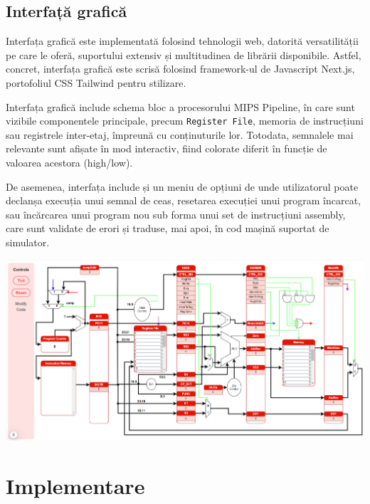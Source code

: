 \documentclass{article}
\begin{document}
\subsection{Interfață grafică}
Interfața grafică este implementată folosind tehnologii web, datorită versatilității pe care le oferă, suportului extensiv și multitudinea de librării disponibile. Astfel, concret, interfața grafică este scrisă folosind framework-ul de Javascript Next.js, portofoliul CSS Tailwind pentru stilizare.

Interfața grafică include schema bloc a procesorului MIPS Pipeline, în care sunt vizibile componentele principale, precum \texttt{Register File}, memoria de instrucțiuni sau registrele inter-etaj, împreună cu conținuturile lor. Totodata, semnalele mai relevante sunt afișate în mod interactiv, fiind colorate diferit în funcție de valoarea acestora (high/low).

De asemenea, interfața include și un meniu de opțiuni de unde utilizatorul poate declanșa execuția unui semnal de ceas, resetarea execuției unui program încarcat, sau încărcarea unui program nou sub forma unui set de instrucțiuni assembly, care sunt validate de erori și traduse, mai apoi, în cod mașină suportat de simulator.

\begin{tcolorbox}[colback=white!5!white,colframe=violet!75!black,title=Design interfață grafică]
    \begin{center}
        \includegraphics[width=\textwidth]{img/ui_ss.png}
    \end{center}
\end{tcolorbox}

\newpage

\section{Implementare}
\end{document}
